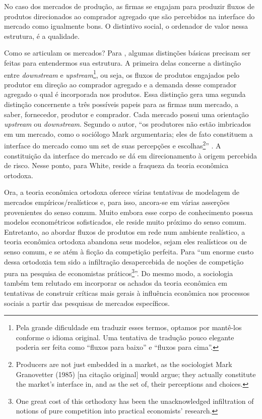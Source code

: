 \documentclass[a4paper, 12pt, openright, oneside, german, french, english, brazil]{abntex2}
\begin{document}
	No caso dos mercados de produção, as firmas se engajam para produzir fluxos de produtos direcionados ao comprador agregado que são percebidos na interface do mercado como igualmente bons. O distintivo social, o ordenador de valor nessa estrutura, é a qualidade.
	
	Como se articulam os mercados? Para , algumas distinções básicas precisam ser feitas para entendermos sua estrutura. A primeira delas concerne a distinção entre \textit{downstream} e \textit{upstream}\footnote{Pela grande dificuldade em traduzir esses termos, optamos por mantê-los conforme o idioma original. Uma tentativa de tradução pouco elegante poderia ser feita como ``fluxos para baixo'' e ``fluxos para cima''.}, ou seja, os fluxos de produtos engajados pelo produtor em direção ao comprador agregado e a demanda desse comprador agregado o qual é incorporada nos produtos. Essa distinção gera uma segunda distinção concernente a três possíveis papeis para as firmas num mercado, a saber, fornecedor, produtor e comprador. Cada mercado possui uma orientação \textit{upstream} ou \textit{downstream}. Segundo o autor, ``os produtores não estão imbricados em um mercado, como o sociólogo Mark  argumentaria; eles de fato constituem a interface do mercado como um set de suas percepções e escolhas\footnote{Producers are not just embedded in a market, as the sociologist Mark Granovetter (1985) [na citação original] would argue; they actually constitute the market's interface in, and as the set of, their perceptions and choices.}'' \cite[p. 8]{white2002markets}. A constituição da interface do mercado se dá em direcionamento à origem percebida de risco. Nesse ponto, para White, reside a fraqueza da teoria econômica ortodoxa.
	
	Ora, a teoria econômica ortodoxa oferece várias tentativas de modelagem de mercados empíricos/realísticos e, para isso, ancora-se em várias asserções provenientes do senso comum. Muito embora esse corpo de conhecimento possua modelos econométricos sofisticados, ele reside muito próximo do senso comum. Entretanto, ao abordar fluxos de produtos em rede num ambiente realístico, a teoria econômica ortodoxa abandona seus modelos, sejam eles realísticos ou de senso comum, e se atém à ficção da competição perfeita. Para  ``um enorme custo dessa ortodoxia tem sido a infiltração desapercebida de noções de competição pura na pesquisa de economistas práticos\footnote{One great cost of this orthodoxy has been the unacknowledged infiltration of notions of pure competition into practical economists' research.}''. Do mesmo modo, a sociologia também tem relutado em incorporar os achados da teoria econômica em tentativas de construir críticas mais gerais à influência econômica nos processos sociais a partir das pesquisas de mercados específicos.
	
\end{document}
